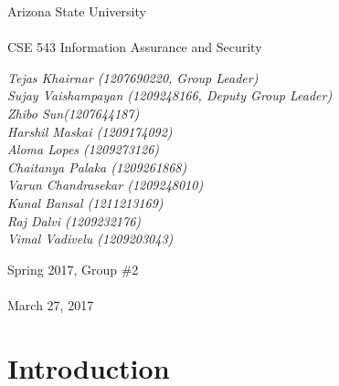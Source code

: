 \documentclass[11pt]{article}
\title{\fulltitle}
\date{}
\begin{document}
	\begingroup
		\fontsize{20pt}{20pt}\selectfont
		\begin{center}
			Arizona State University \\~\\
			CSE 543 Information Assurance and Security
		\end{center}
	\endgroup
	{\let\newpage\relax\maketitle}
	\begingroup
	\fontsize{15pt}{15pt}\selectfont
	\begin{center}
		\textit{Tejas Khairnar (1207690220, Group Leader) \\Sujay Vaishampayan (1209248166, Deputy Group Leader)\\  Zhibo Sun(1207644187)\\Harshil Maskai (1209174092)\\ Aloma Lopes (1209273126)\\ Chaitanya Palaka (1209261868)\\ Varun Chandrasekar (1209248010) \\ Kunal Bansal (1211213169) \\ Raj Dalvi (1209232176) \\ Vimal Vadivelu (1209203043)}
	\end{center}
	\endgroup
	\begin{abstract}
		\textbf{\textit{There are a multitude of potentially malicious samples out there in the wild. The signatures for these malwares are mainly created manually. This creates a semantic gap while detecting known pieces of malware and unknown pieces of malwares. This survey article provides an overview of various techniques used to perform malware analysis, detect and prevent them. It also covers various strategies to detect these malwares pro-actively and be one step ahead of the attackers.}}
	\end{abstract}
		\begingroup
		\fontsize{10pt}{10pt}\selectfont
			\begin{center}
				Spring 2017, Group \#2 \\~\\
				March 27, 2017
			\end{center}
		\endgroup


	\newpage
	\tableofcontents
	\newpage
	\listoftables
	\newpage
	\listoffigures
	\newpage
	\section{Introduction}
\end{document}
